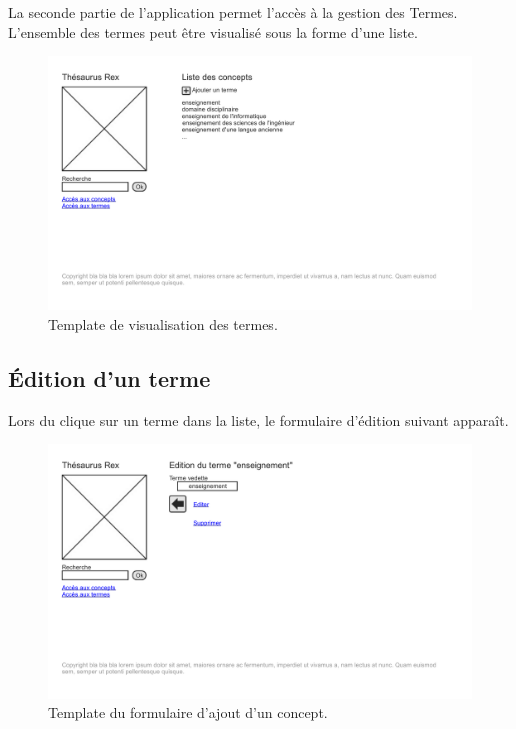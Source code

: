 La seconde partie de l'application permet l'accès à la gestion des Termes. L'ensemble des termes peut être visualisé sous la forme d'une liste.
\begin{figure}[H]
\begin{center}
\includegraphics[width=\textwidth]{files/template_termes}
\end{center}
\caption{Template de visualisation des termes.}
\end{figure}

\subsection{Édition d'un terme}

Lors du clique sur un terme dans la liste, le formulaire d'édition suivant apparaît.
\begin{figure}[H]
\begin{center}
\includegraphics[width=\textwidth]{files/template_terme_edit}
\end{center}
\caption{Template du formulaire d'ajout d'un concept.}
\end{figure}
